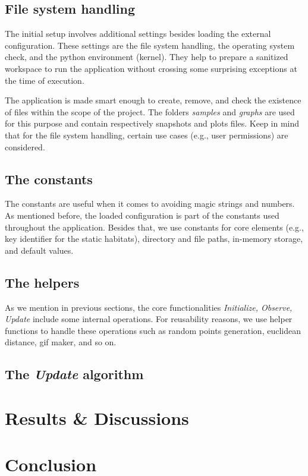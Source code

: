 \subsection{File system handling}
The initial setup involves additional settings besides loading the external configuration. These settings are the file system handling, the operating system check, and the python environment (kernel). They help to prepare a sanitized workspace to run the application without crossing some surprising exceptions at the time of execution.

The application is made smart enough to create, remove, and check the existence of files within the scope of the project. The folders \emph{samples} and \emph{graphs} are used for this purpose and contain respectively snapshots and plots files. Keep in mind that for the file system handling, certain use cases (e.g., user permissions) are considered.

\subsection{The constants}
The constants are useful when it comes to avoiding magic strings and numbers. As mentioned before, the loaded configuration is part of the constants used throughout the application. Besides that, we use constants for core elements (e.g., key identifier for the static habitats), directory and file paths, in-memory storage, and default values.

\subsection{The helpers}
As we mention in previous sections, the core functionalities \emph{Initialize, Observe, Update} include some internal operations. For reusability reasons, we use helper functions to handle these operations such as random points generation, euclidean distance, gif maker, and so on.

\subsection{The \emph{Update} algorithm}


\section{Results \& Discussions}

\section{Conclusion}
